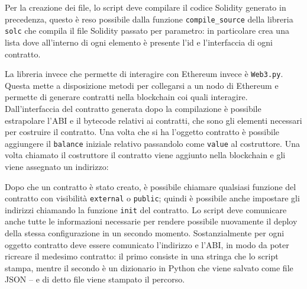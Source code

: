 \documentclass[12pt,a4paper]{report}
\begin{document}
Per la creazione dei file, lo script deve compilare il codice Solidity
generato in precedenza, questo è reso possibile dalla funzione
\texttt{compile\_source} della libreria \texttt{solc} che compila il
file Solidity passato per parametro: in particolare crea una lista dove
all'interno di ogni elemento è presente l'id e l'interfaccia di ogni
contratto.

La libreria invece che permette di interagire con Ethereum invece è
\texttt{Web3.py}. Questa mette a disposizione metodi per collegarsi a un
nodo di Ethereum e permette di generare contratti nella blockchain coi
quali interagire. Dall'interfaccia del contratto generata dopo la
compilazione è possibile estrapolare l'ABI e il bytecode relativi ai
contratti, che sono gli elementi necessari per costruire il contratto.
Una volta che si ha l'oggetto contratto è possibile aggiungere il
\texttt{balance} iniziale relativo passandolo come \texttt{value} al
costruttore. Una volta chiamato il costruttore il contratto viene
aggiunto nella blockchain e gli viene assegnato un indirizzo:

\begin{Shaded}
\begin{Highlighting}[]
\OperatorTok{=}
\OperatorTok{=}\NormalTok{contract_interface[}\NormalTok{],}
\OperatorTok{=}\NormalTok{contract_interface[}\NormalTok{])}
\OperatorTok{=}
    \NormalTok{(}\NormalTok{)}
\OperatorTok{=}
\end{Highlighting}
\end{Shaded}

Dopo che un contratto è stato creato, è possibile chiamare qualsiasi
funzione del contratto con visibilità \texttt{external} o
\texttt{public}; quindi è possibile anche impostare gli indirizzi
chiamando la funzione \texttt{init} del contratto. Lo script deve
comunicare anche tutte le informazioni necessarie per rendere possibile
nuovamente il deploy della stessa configurazione in un secondo momento.
Sostanzialmente per ogni oggetto contratto deve essere comunicato
l'indirizzo e l'ABI, in modo da poter ricreare il medesimo contratto: il
primo consiste in una stringa che lo script stampa, mentre il secondo è
un dizionario in Python che viene salvato come file JSON -- e di detto
file viene stampato il percorso.
\end{document}
